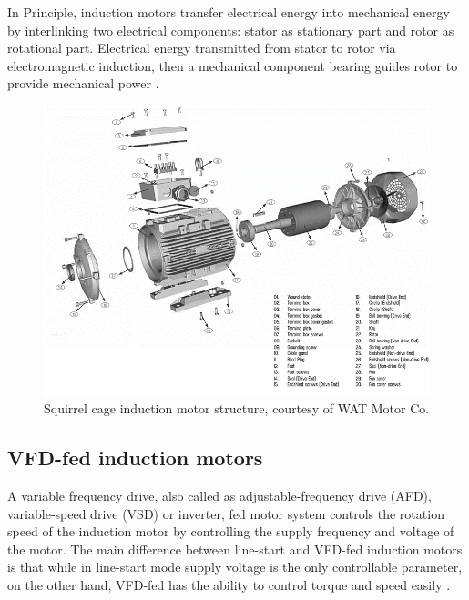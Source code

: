 In Principle, induction motors transfer electrical energy into mechanical energy by interlinking two electrical components: stator as stationary part and rotor as rotational part. Electrical energy transmitted from stator to rotor via electromagnetic induction, then a mechanical component bearing guides rotor to provide mechanical power \cite{oliver1992electric,karmakar2016induction}.

\begin{figure}[h]
	\centering
	\includegraphics[width=350pt,keepaspectratio=true]{./fig/watmotor.PNG}
	\caption{Squirrel cage induction motor structure, courtesy of WAT Motor Co.}	
	\label{motor}
\end{figure}

\subsection{VFD-fed induction motors}

A variable frequency drive, also called as adjustable-frequency drive (AFD), variable-speed drive (VSD) or inverter, fed motor system controls the rotation speed of the induction motor by controlling the supply frequency and voltage of the motor. The main difference between line-start and VFD-fed induction motors is that while in line-start mode supply voltage is the only controllable parameter, on the other hand, VFD-fed has the ability to control torque and speed easily \cite{faiz2017fault}.


